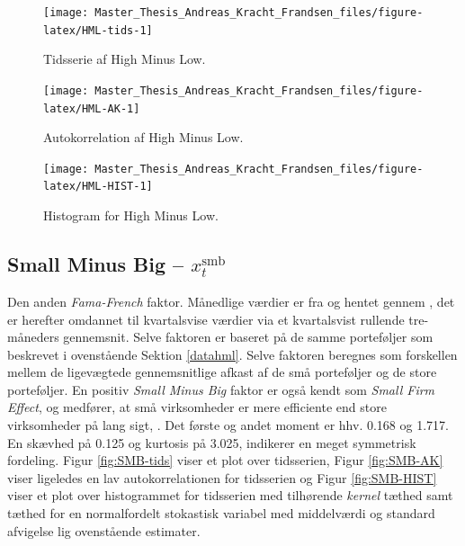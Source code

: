 \documentclass[
  a4paper,
  oneside]{memoir}
\begin{document}
\begin{figure}[H]

{\centering \texttt{[image: Master\_Thesis\_Andreas\_Kracht\_Frandsen\_files/figure-latex/HML-tids-1]} 

}

\caption{Tidsserie af High Minus Low.}\label{fig:HML-tids}
\end{figure}

\begin{figure}[H]

{\centering \texttt{[image: Master\_Thesis\_Andreas\_Kracht\_Frandsen\_files/figure-latex/HML-AK-1]} 

}

\caption{Autokorrelation af High Minus Low.}\label{fig:HML-AK}
\end{figure}

\begin{figure}[H]

{\centering \texttt{[image: Master\_Thesis\_Andreas\_Kracht\_Frandsen\_files/figure-latex/HML-HIST-1]} 

}

\caption{Histogram for High Minus Low.}\label{fig:HML-HIST}
\end{figure}

\hypertarget{datasmb}{%
\subsection{\texorpdfstring{Small Minus Big -- \(x_t^{\text{smb}}\)}{Small Minus Big -- x\_t\^{}\{\textbackslash text\{smb\}\}}}\label{datasmb}}

Den anden \emph{Fama-French} faktor. Månedlige værdier er fra \citep{CRSPakt} og hentet gennem \citep{French2020}, det er herefter omdannet til kvartalsvise værdier via et kvartalsvist rullende tre-måneders gennemsnit. Selve faktoren er baseret på de samme porteføljer som beskrevet i ovenstående Sektion \ref{datahml}. Selve faktoren beregnes som forskellen mellem de ligevægtede gennemsnitlige afkast af de små porteføljer og de store porteføljer. En positiv \emph{Small Minus Big} faktor er også kendt som \emph{Small Firm Effect}, og medfører, at små virksomheder er mere efficiente end store virksomheder på lang sigt, \citep{French1993}. Det første og andet moment er hhv. 0.168 og 1.717. En skævhed på 0.125 og kurtosis på 3.025, indikerer en meget symmetrisk fordeling. Figur \ref{fig:SMB-tids} viser et plot over tidsserien, Figur \ref{fig:SMB-AK} viser ligeledes en lav autokorrelationen for tidsserien og Figur \ref{fig:SMB-HIST} viser et plot over histogrammet for tidsserien med tilhørende \emph{kernel} tæthed samt tæthed for en normalfordelt stokastisk variabel med middelværdi og standard afvigelse lig ovenstående estimater.
\end{document}
